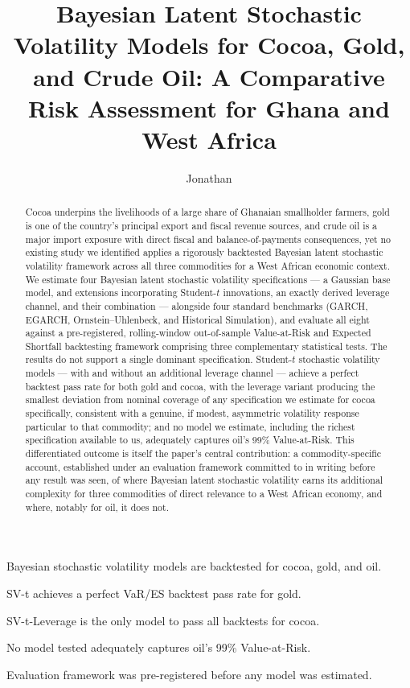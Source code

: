\documentclass[preprint,12pt,authoryear]{elsarticle}
\begin{document}
\begin{frontmatter}

\title{Bayesian Latent Stochastic Volatility Models for Cocoa, Gold, and Crude Oil: A Comparative Risk Assessment for Ghana and West Africa}

\author{Jonathan}

\begin{abstract}
\noindent
Cocoa underpins the livelihoods of a large share of Ghanaian smallholder farmers, gold is one of the country's principal export and fiscal revenue sources, and crude oil is a major import exposure with direct fiscal and balance-of-payments consequences, yet no existing study we identified applies a rigorously backtested Bayesian latent stochastic volatility framework across all three commodities for a West African economic context. We estimate four Bayesian latent stochastic volatility specifications --- a Gaussian base model, and extensions incorporating Student-$t$ innovations, an exactly derived leverage channel, and their combination --- alongside four standard benchmarks (GARCH, EGARCH, Ornstein--Uhlenbeck, and Historical Simulation), and evaluate all eight against a pre-registered, rolling-window out-of-sample Value-at-Risk and Expected Shortfall backtesting framework comprising three complementary statistical tests. The results do not support a single dominant specification. Student-$t$ stochastic volatility models --- with and without an additional leverage channel --- achieve a perfect backtest pass rate for both gold and cocoa, with the leverage variant producing the smallest deviation from nominal coverage of any specification we estimate for cocoa specifically, consistent with a genuine, if modest, asymmetric volatility response particular to that commodity; and no model we estimate, including the richest specification available to us, adequately captures oil's 99\% Value-at-Risk. This differentiated outcome is itself the paper's central contribution: a commodity-specific account, established under an evaluation framework committed to in writing before any result was seen, of where Bayesian latent stochastic volatility earns its additional complexity for three commodities of direct relevance to a West African economy, and where, notably for oil, it does not.
\end{abstract}

\begin{highlights}
\item Bayesian stochastic volatility models are backtested for cocoa, gold, and oil.
\item SV-t achieves a perfect VaR/ES backtest pass rate for gold.
\item SV-t-Leverage is the only model to pass all backtests for cocoa.
\item No model tested adequately captures oil's 99\% Value-at-Risk.
\item Evaluation framework was pre-registered before any model was estimated.
\end{highlights}


\end{frontmatter}
\end{document}
